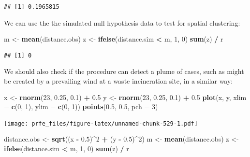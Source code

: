 \documentclass[12pt,a4paper]{book}
\newenvironment{Shaded}{\begin{snugshade}}{\end{snugshade}}
\newcommand{\DataTypeTok}[1]{\textcolor[rgb]{0.13,0.29,0.53}{#1}}
\newcommand{\DecValTok}[1]{\textcolor[rgb]{0.00,0.00,0.81}{#1}}
\newcommand{\FloatTok}[1]{\textcolor[rgb]{0.00,0.00,0.81}{#1}}
\newcommand{\KeywordTok}[1]{\textcolor[rgb]{0.13,0.29,0.53}{\textbf{#1}}}
\newcommand{\NormalTok}[1]{#1}
\newcommand{\OperatorTok}[1]{\textcolor[rgb]{0.81,0.36,0.00}{\textbf{#1}}}
\newcommand{\StringTok}[1]{\textcolor[rgb]{0.31,0.60,0.02}{#1}}
\theoremstyle{definition}
\theoremstyle{definition}
\theoremstyle{definition}
\theoremstyle{remark}
\begin{document}
\begin{verbatim}
## [1] 0.1965815
\end{verbatim}

We can use the the simulated null hypothesis data to test for spatial
clustering:

\begin{Shaded}
\begin{Highlighting}[]
\NormalTok{m <-}\StringTok{ }\KeywordTok{mean}\NormalTok{(distance.obs)}
\NormalTok{z <-}\StringTok{ }\KeywordTok{ifelse}\NormalTok{(distance.sim }\OperatorTok{<}\StringTok{ }\NormalTok{m, }\DecValTok{1}\NormalTok{, }\DecValTok{0}\NormalTok{)}
\KeywordTok{sum}\NormalTok{(z) }\OperatorTok{/}\StringTok{ }\NormalTok{r}
\end{Highlighting}
\end{Shaded}

\begin{verbatim}
## [1] 0
\end{verbatim}

We should also check if the procedure can detect a plume of cases, such
as might be created by a prevailing wind at a waste incineration site,
in a similar way:

\begin{Shaded}
\begin{Highlighting}[]
\NormalTok{x <-}\StringTok{ }\KeywordTok{rnorm}\NormalTok{(}\DecValTok{23}\NormalTok{, }\FloatTok{0.25}\NormalTok{, }\FloatTok{0.1}\NormalTok{) }\OperatorTok{+}\StringTok{ }\FloatTok{0.5}
\NormalTok{y <-}\StringTok{ }\KeywordTok{rnorm}\NormalTok{(}\DecValTok{23}\NormalTok{, }\FloatTok{0.25}\NormalTok{, }\FloatTok{0.1}\NormalTok{) }\OperatorTok{+}\StringTok{ }\FloatTok{0.5}
\KeywordTok{plot}\NormalTok{(x, y, }\DataTypeTok{xlim =} \KeywordTok{c}\NormalTok{(}\DecValTok{0}\NormalTok{, }\DecValTok{1}\NormalTok{), }\DataTypeTok{ylim =} \KeywordTok{c}\NormalTok{(}\DecValTok{0}\NormalTok{, }\DecValTok{1}\NormalTok{))}
\KeywordTok{points}\NormalTok{(}\FloatTok{0.5}\NormalTok{, }\FloatTok{0.5}\NormalTok{, }\DataTypeTok{pch =} \DecValTok{3}\NormalTok{)}
\end{Highlighting}
\end{Shaded}

\texttt{[image: prfe\_files/figure-latex/unnamed-chunk-529-1.pdf]}

\begin{Shaded}
\begin{Highlighting}[]
\NormalTok{distance.obs <-}\StringTok{ }\KeywordTok{sqrt}\NormalTok{((x }\OperatorTok{-}\StringTok{ }\FloatTok{0.5}\NormalTok{)}\OperatorTok{^}\DecValTok{2} \OperatorTok{+}\StringTok{ }\NormalTok{(y }\OperatorTok{-}\StringTok{ }\FloatTok{0.5}\NormalTok{)}\OperatorTok{^}\DecValTok{2}\NormalTok{)}
\NormalTok{m <-}\StringTok{ }\KeywordTok{mean}\NormalTok{(distance.obs)}
\NormalTok{z <-}\StringTok{ }\KeywordTok{ifelse}\NormalTok{(distance.sim }\OperatorTok{<}\StringTok{ }\NormalTok{m, }\DecValTok{1}\NormalTok{, }\DecValTok{0}\NormalTok{)}
\KeywordTok{sum}\NormalTok{(z) }\OperatorTok{/}\StringTok{ }\NormalTok{r}
\end{Highlighting}
\end{Shaded}
\end{document}
